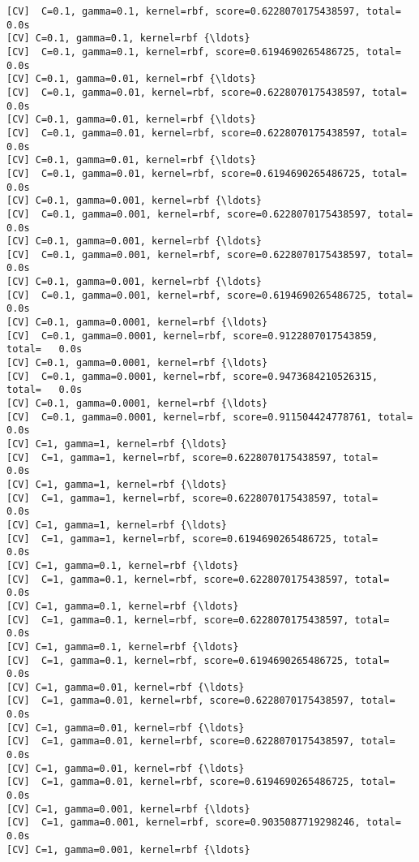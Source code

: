 \documentclass[11pt]{article}
\begin{document}
    \begin{Verbatim}[commandchars=\\\{\}]
[CV]  C=0.1, gamma=0.1, kernel=rbf, score=0.6228070175438597, total=   0.0s
[CV] C=0.1, gamma=0.1, kernel=rbf {\ldots}
[CV]  C=0.1, gamma=0.1, kernel=rbf, score=0.6194690265486725, total=   0.0s
[CV] C=0.1, gamma=0.01, kernel=rbf {\ldots}
[CV]  C=0.1, gamma=0.01, kernel=rbf, score=0.6228070175438597, total=   0.0s
[CV] C=0.1, gamma=0.01, kernel=rbf {\ldots}
[CV]  C=0.1, gamma=0.01, kernel=rbf, score=0.6228070175438597, total=   0.0s
[CV] C=0.1, gamma=0.01, kernel=rbf {\ldots}
[CV]  C=0.1, gamma=0.01, kernel=rbf, score=0.6194690265486725, total=   0.0s
[CV] C=0.1, gamma=0.001, kernel=rbf {\ldots}
[CV]  C=0.1, gamma=0.001, kernel=rbf, score=0.6228070175438597, total=   0.0s
[CV] C=0.1, gamma=0.001, kernel=rbf {\ldots}
[CV]  C=0.1, gamma=0.001, kernel=rbf, score=0.6228070175438597, total=   0.0s
[CV] C=0.1, gamma=0.001, kernel=rbf {\ldots}
[CV]  C=0.1, gamma=0.001, kernel=rbf, score=0.6194690265486725, total=   0.0s
[CV] C=0.1, gamma=0.0001, kernel=rbf {\ldots}
[CV]  C=0.1, gamma=0.0001, kernel=rbf, score=0.9122807017543859, total=   0.0s
[CV] C=0.1, gamma=0.0001, kernel=rbf {\ldots}
[CV]  C=0.1, gamma=0.0001, kernel=rbf, score=0.9473684210526315, total=   0.0s
[CV] C=0.1, gamma=0.0001, kernel=rbf {\ldots}
[CV]  C=0.1, gamma=0.0001, kernel=rbf, score=0.911504424778761, total=   0.0s
[CV] C=1, gamma=1, kernel=rbf {\ldots}
[CV]  C=1, gamma=1, kernel=rbf, score=0.6228070175438597, total=   0.0s
[CV] C=1, gamma=1, kernel=rbf {\ldots}
[CV]  C=1, gamma=1, kernel=rbf, score=0.6228070175438597, total=   0.0s
[CV] C=1, gamma=1, kernel=rbf {\ldots}
[CV]  C=1, gamma=1, kernel=rbf, score=0.6194690265486725, total=   0.0s
[CV] C=1, gamma=0.1, kernel=rbf {\ldots}
[CV]  C=1, gamma=0.1, kernel=rbf, score=0.6228070175438597, total=   0.0s
[CV] C=1, gamma=0.1, kernel=rbf {\ldots}
[CV]  C=1, gamma=0.1, kernel=rbf, score=0.6228070175438597, total=   0.0s
[CV] C=1, gamma=0.1, kernel=rbf {\ldots}
[CV]  C=1, gamma=0.1, kernel=rbf, score=0.6194690265486725, total=   0.0s
[CV] C=1, gamma=0.01, kernel=rbf {\ldots}
[CV]  C=1, gamma=0.01, kernel=rbf, score=0.6228070175438597, total=   0.0s
[CV] C=1, gamma=0.01, kernel=rbf {\ldots}
[CV]  C=1, gamma=0.01, kernel=rbf, score=0.6228070175438597, total=   0.0s
[CV] C=1, gamma=0.01, kernel=rbf {\ldots}
[CV]  C=1, gamma=0.01, kernel=rbf, score=0.6194690265486725, total=   0.0s
[CV] C=1, gamma=0.001, kernel=rbf {\ldots}
[CV]  C=1, gamma=0.001, kernel=rbf, score=0.9035087719298246, total=   0.0s
[CV] C=1, gamma=0.001, kernel=rbf {\ldots}

\end{Verbatim}
\end{document}
